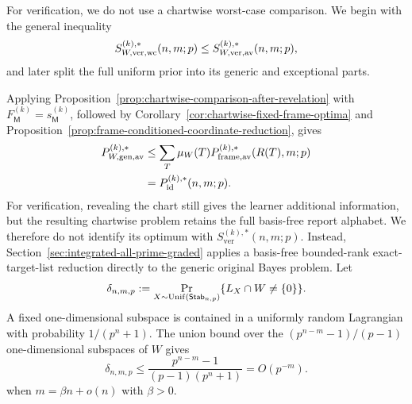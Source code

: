 \documentclass[11pt]{article}
\newcommand{\1}{\mathbf 1}
\theoremstyle{plain}
\theoremstyle{definition}
\theoremstyle{remark}
\begin{document}
For verification, we do not use a chartwise worst-case comparison. We begin
with the general inequality
\begin{equation}
 S_{W,\rm ver,wc}^{(k),*}(n,m;p)
 \le S_{W,\rm ver,av}^{(k),*}(n,m;p),
 \label{eq:fixed-W-ver-wc-to-av}
\end{equation}
and later split the full uniform prior into its generic and exceptional parts.

Applying Proposition~\ref{prop:chartwise-comparison-after-revelation} with
$F_{\mathsf M}^{(k)}=s_{\mathsf M}^{(k)}$, followed by
Corollary~\ref{cor:chartwise-fixed-frame-optima} and
Proposition~\ref{prop:frame-conditioned-coordinate-reduction}, gives
\begin{align}
 P_{W,\rm gen,av}^{(k),*}
 &\le\sum_T\mu_W(T)P_{\rm frame,av}^{(k),*}(R(T),m;p)
 \notag\\
 &=P_{\mathrm{id}}^{(k),*}(n,m;p).
 \label{eq:fixed-W-generic-average-comparison}
\end{align}
For verification, revealing the chart still gives the learner additional
information, but the resulting chartwise problem retains the full basis-free
report alphabet.  We therefore do not identify its optimum with
$S_{\mathrm{ver}}^{(k),*}(n,m;p)$.  Instead,
Section~\ref{sec:integrated-all-prime-graded} applies a basis-free
bounded-rank exact-target-list reduction directly to the generic original
Bayes problem.
Let
\begin{equation}
 \delta_{n,m,p}:=\Pr_{X\sim{\rm Unif}(\mathsf{Stab}_{n,p})}
 \{L_X\cap W\ne\{0\}\}.
 \label{eq:fixed-W-delta}
\end{equation}
A fixed one-dimensional subspace is contained in a uniformly random Lagrangian with
probability $1/(p^n+1)$.  The union bound over the
$(p^{n-m}-1)/(p-1)$ one-dimensional subspaces of $W$ gives
\begin{equation}
 \delta_{n,m,p}\le\frac{p^{n-m}-1}{(p-1)(p^n+1)}=O(p^{-m}).
 \label{eq:fixed-W-exceptional-bound}
\end{equation}
when $m=\beta n+o(n)$ with $\beta>0$.
\end{document}
